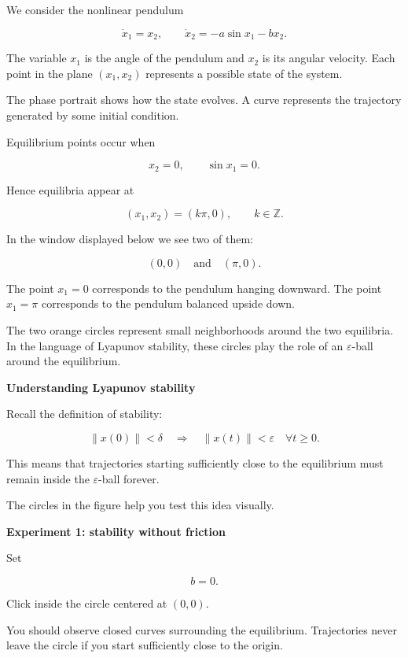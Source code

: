 


We consider the nonlinear pendulum

\[
\dot{x}_1 = x_2, \qquad
\dot{x}_2 = -a\sin x_1 - b x_2 .
\]

The variable \(x_1\) is the angle of the pendulum and \(x_2\) is its
angular velocity. Each point in the plane \((x_1,x_2)\) represents a
possible state of the system.

The phase portrait shows how the state evolves. A curve represents the
trajectory generated by some initial condition.

Equilibrium points occur when

\[
x_2 = 0, \qquad \sin x_1 = 0 .
\]

Hence equilibria appear at

\[
(x_1,x_2) = (k\pi,0), \qquad k\in\mathbb{Z}.
\]

In the window displayed below we see two of them:

\[
(0,0) \quad \text{and} \quad (\pi,0).
\]

The point \(x_1=0\) corresponds to the pendulum hanging downward.
The point \(x_1=\pi\) corresponds to the pendulum balanced upside down.

The two orange circles represent small neighborhoods around the two
equilibria. In the language of Lyapunov stability, these circles play
the role of an \(\varepsilon\)-ball around the equilibrium.


\textbf{Understanding Lyapunov stability}

Recall the definition of stability:

\[
\|x(0)\| < \delta
\quad\Rightarrow\quad
\|x(t)\| < \varepsilon
\quad \forall t \ge 0 .
\]

This means that trajectories starting sufficiently close to the
equilibrium must remain inside the \(\varepsilon\)-ball forever.

The circles in the figure help you test this idea visually.

\textbf{Experiment 1: stability without friction}

Set

\[
b = 0 .
\]

Click inside the circle centered at \((0,0)\).

You should observe closed curves surrounding the equilibrium.
Trajectories never leave the circle if you start sufficiently close to
the origin.

